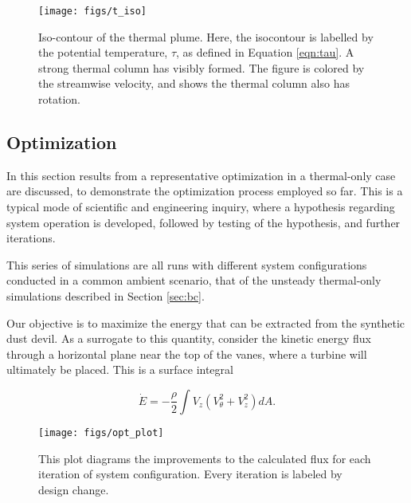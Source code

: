 %
%
  \begin{figure}[!htb]
   \begin{center}
    \texttt{[image: figs/t\_iso]}
    \caption{Iso-contour of the thermal plume. Here, the isocontour is
    labelled by the potential temperature, $\tau$, as defined in
    Equation \ref{eqn:tau}. A strong thermal column has visibly formed. The
    figure is colored by the streamwise velocity, and shows the thermal
    column also has rotation.} 
    \label{fig:field_real}
   \end{center}
  \end{figure}

\subsection{Optimization}

In this section results from a representative optimization
in a thermal-only case are discussed, to demonstrate the optimization 
process employed so far. This is a typical mode of scientific and
engineering inquiry, where a hypothesis regarding system operation is
developed, followed by testing of the hypothesis, and further
iterations.  

This series of simulations are all runs with different system
configurations conducted in a common ambient scenario, that of the
unsteady thermal-only simulations described in Section \ref{sec:bc}. 

Our objective is to maximize the energy that can be 
extracted from the synthetic dust devil. As a surrogate to this
quantity, consider the kinetic energy flux through a horizontal plane
near the top of the vanes, where a turbine will ultimately be
placed. This is a surface integral\cite{landau1959fm}


 \begin{equation}
 \dot E = -\frac{\rho }{2} \int V_z (V_{\theta}^2 + V_z^2 ) dA.
 \end{equation}

\begin{figure}[htb]
 \centering
 \texttt{[image: figs/opt\_plot]}
 \caption{This plot diagrams the improvements to the calculated flux for  
 each iteration of system configuration. Every iteration is labeled by
 design change.}
 \label{fig:opt_plot}
\end{figure}



